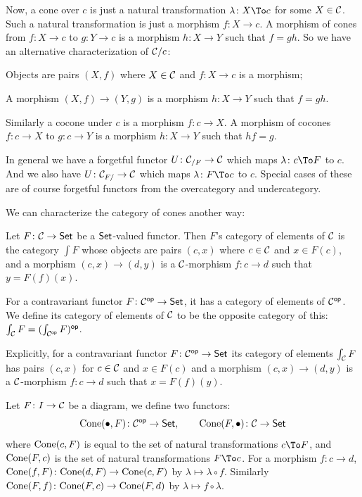 \edefn

Now, a cone over $c$ is just a natural transformation $\lambda\colon X\To c$ for some $X\in{{\cal C}}$.
Such a natural transformation is just a morphism $f\colon X\to c$.
A morphism of cones from $f\colon X\to c$ to $g\colon Y\to c$ is a morphism $h\colon X\to Y$ such that $f=gh$.
So we have an alternative characterization of ${{\cal C}}/c$:
\benum
    \item Objects are pairs $(X,f)$ where $X\in{{\cal C}}$ and $f\colon X\to c$ is a morphism;
    \item A morphism $(X,f)\to(Y,g)$ is a morphism $h\colon X\to Y$ such that $f=gh$.
\eenum

Similarly a cocone under $c$ is a morphism $f\colon c\to X$.
A morphism of cocones $f\colon c\to X$ to $g\colon c\to Y$ is a morphism $h\colon X\to Y$ such that $hf=g$.

In general we have a forgetful functor $U\colon{{\cal C}}_{/F}\to{{\cal C}}$ which maps $\lambda\colon c\To F$ to $c$.
And we also have $U\colon{{\cal C}}_{F/}\to{{\cal C}}$ which maps $\lambda\colon F\To c$ to $c$.
Special cases of these are of course forgetful functors from the overcategory and undercategory.

We can characterize the category of cones another way:

\bdefn

    Let $F\colon{{\cal C}}\to{\sf Set}$ be a ${\sf Set}$-valued functor.
    Then $F$'s {\emphcolor category of elements} of ${{\cal C}}$ is the category $\int F$ whose objects are pairs $(c,x)$ where $c\in{{\cal C}}$ and $x\in F(c)$, and a morphism
    $(c,x)\to(d,y)$ is a ${{\cal C}}$-morphism $f\colon c\to d$ such that $y=F(f)(x)$.

    For a contravariant functor $F\colon{{\cal C}}^{\sf op}\to{\sf Set}$, it has a category of elements of ${{\cal C}}^{\sf op}$.
    We define its category of elements of ${{\cal C}}$ to be the opposite category of this: $\int_{{\cal C}} F=(\int_{{{\cal C}}^{\sf op}}F)^{\sf op}$.

\edefn

Explicitly, for a contravariant functor $F\colon{{\cal C}}^{\sf op}\to{\sf Set}$ its category of elements $\int_{{\cal C}} F$ has pairs $(c,x)$ for $c\in{{\cal C}}$ and $x\in F(c)$ and a morphism
$(c,x)\to(d,y)$ is a ${{\cal C}}$-morphism $f\colon c\to d$ such that $x=F(f)(y)$.

Let $F\colon I\to{{\cal C}}$ be a diagram, we define two functors:
$$ {\rm Cone}(\bullet,F)\colon{{\cal C}}^{\sf op}\to{\sf Set},\qquad {\rm Cone}(F,\bullet)\colon{{\cal C}}\to{\sf Set} $$
where ${\rm Cone}(c,F)$ is equal to the set of natural transformations $c\To F$, and ${\rm Cone}(F,c)$ is the set of natural transformations $F\To c$.
For a morphism $f\colon c\to d$, ${\rm Cone}(f,F)\colon{\rm Cone}(d,F)\to{\rm Cone}(c,F)$ by $\lambda\mapsto\lambda\circ f$.
Similarly ${\rm Cone}(F,f)\colon{\rm Cone}(F,c)\to{\rm Cone}(F,d)$ by $\lambda\mapsto f\circ\lambda$.

